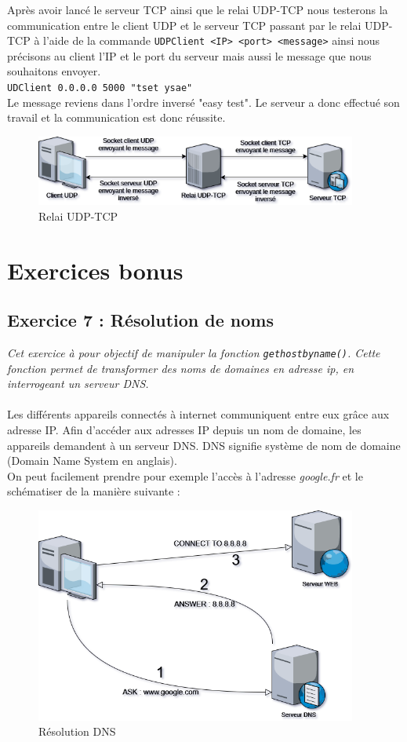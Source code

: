 Après avoir lancé le serveur TCP ainsi que le relai UDP-TCP nous testerons la communication entre le client UDP et le serveur TCP passant par le relai UDP-TCP à l'aide de la commande \texttt{UDPClient <IP> <port> <message>} ainsi nous précisons au client l'IP et le port du serveur mais aussi le message que nous souhaitons envoyer.\\
\texttt{UDClient 0.0.0.0 5000 "tset ysae"}\\
Le message reviens dans l'ordre inversé "easy test". Le serveur a donc effectué son travail et la communication est donc réussite.

\begin{figure}[H]
  \centering
  \includegraphics[width=300pt]{./cpp/Pictures/tp7+tp8-relay-UDP-TCP}
  \caption{Relai UDP-TCP}
  \label{Relai UDP-TCP}
\end{figure}

\section{Exercices bonus}
\subsection{Exercice 7 : Résolution de noms}
\textit{Cet exercice à pour objectif de manipuler la fonction \texttt{gethostbyname()}. Cette fonction permet de transformer des noms de domaines en adresse ip, en interrogeant un serveur DNS.}
\\\\
Les différents appareils connectés à internet communiquent entre eux grâce aux adresse IP. Afin d'accéder aux adresses IP depuis un nom de domaine, les appareils demandent à un serveur DNS. DNS signifie système de nom de domaine (Domain Name System en anglais).\\
On peut facilement prendre pour exemple l'accès à l'adresse \textit{google.fr} et le schématiser de la manière suivante :

\begin{figure}[H]
  \centering
  \includegraphics[width=300pt]{./cpp/Pictures/tp7+tp8-DNS}
  \caption{Résolution DNS}
  \label{Résolution DNS}
\end{figure}

